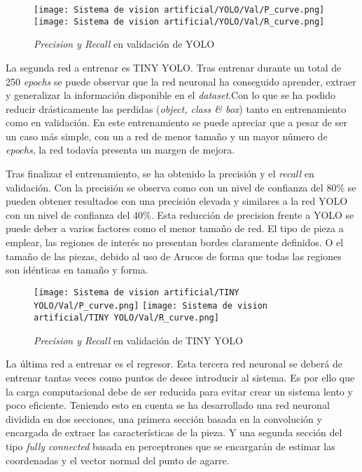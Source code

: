 {\begin{figure}[H]
	\centering
    \texttt{[image: Sistema de vision artificial/YOLO/Val/P\_curve.png]} \hfill
    \texttt{[image: Sistema de vision artificial/YOLO/Val/R\_curve.png]}
	\caption{\textit{Precision y Recall} en validación de YOLO}
	\label{chap:Resumen fig:YOLO Val PR}
\end{figure}

La segunda red a entrenar es TINY YOLO. Tras entrenar durante un total de 250 \textit{epochs} se puede observar que la red neuronal ha conseguido aprender, extraer y generalizar la información disponible en el \textit{dataset}.Con lo que se ha podido reducir drásticamente las perdidas (\textit{object, class \& box}) tanto en entrenamiento como en validación. En este entrenamiento se puede apreciar que a pesar de ser un caso más simple, con un a red de menor tamaño y un mayor número de \textit{epochs}, la red todavía presenta un margen de mejora.

Tras finalizar el entrenamiento, se ha obtenido la precisión y el \textit{recall} en validación. Con la precisión se observa como con un nivel de confianza del 80\% se pueden obtener resultados con una precisión elevada y similares a la red YOLO con un nivel de confianza del 40\%. Esta reducción de precision frente a YOLO se puede deber a varios factores como el menor tamaño de red. El tipo de pieza a emplear, las regiones de interés no presentan bordes claramente definidos. O el tamaño de las piezas, debido al uso de Arucos de forma que todas las regiones son idénticas en tamaño y forma.

\begin{figure}[H]
	\centering
    \texttt{[image: Sistema de vision artificial/TINY YOLO/Val/P\_curve.png]} \hfill
    \texttt{[image: Sistema de vision artificial/TINY YOLO/Val/R\_curve.png]}
	\caption{\textit{Precision y Recall} en validación de TINY YOLO}
	\label{chap:Resumen fig:TINY YOLO Val PR}
\end{figure}

La última red a entrenar es el regresor. Esta tercera red neuronal se deberá de entrenar tantas veces como puntos de desee introducir al sistema. Es por ello que la carga computacional debe de ser reducida para evitar crear un sistema lento y poco eficiente. Teniendo esto en cuenta se ha desarrollado una red neuronal dividida en dos secciones, una primera sección basada en la convolución y encargada de extraer las características de la pieza. Y una segunda sección del tipo \textit{fully connected} basada en perceptrones que se encargarán de estimar las coordenadas y el vector normal del punto de agarre.

}
